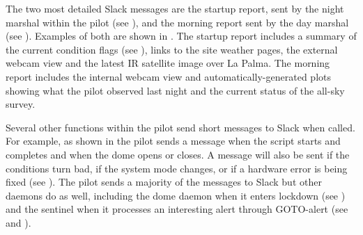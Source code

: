\begin{colsection}
\begin{colsection}
The two most detailed Slack messages are the startup report, sent by the night marshal within the pilot (see ), and the morning report sent by the day marshal (see ). Examples of both are shown in . The startup report includes a summary of the current condition flags (see ), links to the site weather pages, the external webcam view and the latest IR satellite image over La Palma. The morning report includes the internal webcam view and automatically-generated plots showing what the pilot observed last night and the current status of the all-sky survey.

Several other functions within the pilot send short messages to Slack when called. For example, as shown in  the pilot sends a message when the script starts and completes and when the dome opens or closes. A message will also be sent if the conditions turn bad, if the system mode changes, or if a hardware error is being fixed (see ). The pilot sends a majority of the messages to Slack but other daemons do as well, including the dome daemon when it enters lockdown (see ) and the sentinel when it processes an interesting alert through GOTO-alert (see  and ).


\end{colsection}
\end{colsection}
